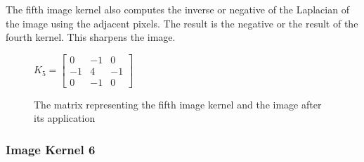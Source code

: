 \documentclass[12pt,letterpaper]{article}
\begin{document}
The fifth image kernel also computes the inverse or negative of the Laplacian of the image using the adjacent pixels. The result is the negative or the result of the fourth kernel. This sharpens the image.
\begin{figure}[ht]
\centering
$K_5 = \begin{bmatrix}
0 & -1 & 0\\
-1 & 4 & -1\\
0 & -1 & 0
\end{bmatrix}$
\hspace{2cm} 
\caption{\small{The matrix representing the fifth image kernel and the image after its application}
\label{fig:ker5} }
\end{figure}

\clearpage 
\newpage

\subsubsection{Image Kernel 6}
\end{document}
